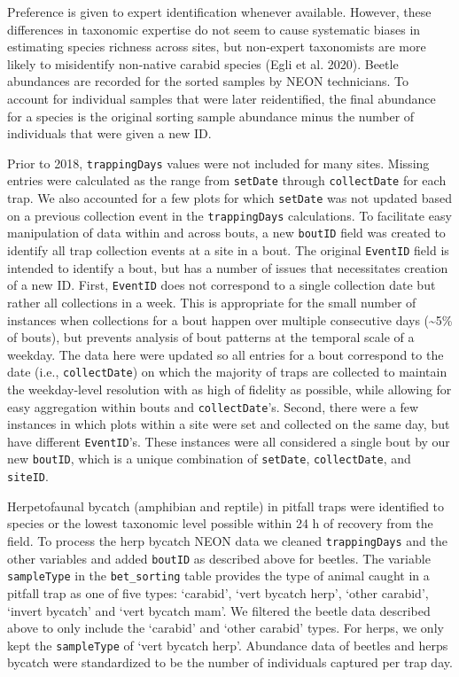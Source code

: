 \documentclass[
  12pt,
]{article}
\begin{document}
Preference is given to expert identification whenever available. However, these differences in taxonomic expertise do not seem to cause systematic biases in estimating species richness across sites, but non-expert taxonomists are more likely to misidentify non-native carabid species (Egli et al. 2020). Beetle abundances are recorded for the sorted samples by NEON technicians. To account for individual samples that were later reidentified, the final abundance for a species is the original sorting sample abundance minus the number of individuals that were given a new ID.

Prior to 2018, \texttt{trappingDays} values were not included for many sites. Missing entries were calculated as the range from \texttt{setDate} through \texttt{collectDate} for each trap. We also accounted for a few plots for which \texttt{setDate} was not updated based on a previous collection event in the \texttt{trappingDays} calculations. To facilitate easy manipulation of data within and across bouts, a new \texttt{boutID} field was created to identify all trap collection events at a site in a bout. The original \texttt{EventID} field is intended to identify a bout, but has a number of issues that necessitates creation of a new ID. First, \texttt{EventID} does not correspond to a single collection date but rather all collections in a week. This is appropriate for the small number of instances when collections for a bout happen over multiple consecutive days (\textasciitilde5\% of bouts), but prevents analysis of bout patterns at the temporal scale of a weekday. The data here were updated so all entries for a bout correspond to the date (i.e., \texttt{collectDate}) on which the majority of traps are collected to maintain the weekday-level resolution with as high of fidelity as possible, while allowing for easy aggregation within bouts and \texttt{collectDate}'s. Second, there were a few instances in which plots within a site were set and collected on the same day, but have different \texttt{EventID}'s. These instances were all considered a single bout by our new \texttt{boutID}, which is a unique combination of \texttt{setDate}, \texttt{collectDate}, and \texttt{siteID}.

Herpetofaunal bycatch (amphibian and reptile) in pitfall traps were identified to species or the lowest taxonomic level possible within 24 h of recovery from the field. To process the herp bycatch NEON data we cleaned \texttt{trappingDays} and the other variables and added \texttt{boutID} as described above for beetles. The variable \texttt{sampleType} in the \texttt{bet\_sorting} table provides the type of animal caught in a pitfall trap as one of five types: `carabid', `vert bycatch herp', `other carabid', `invert bycatch' and `vert bycatch mam'. We filtered the beetle data described above to only include the `carabid' and `other carabid' types. For herps, we only kept the \texttt{sampleType} of `vert bycatch herp'. Abundance data of beetles and herps bycatch were standardized to be the number of individuals captured per trap day.
\end{document}

